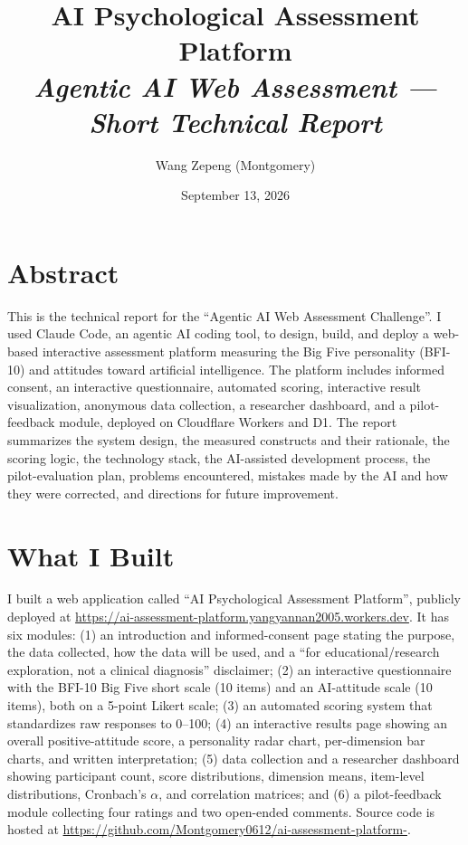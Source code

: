 \documentclass[11pt,a4paper]{article}
\title{\bfseries AI Psychological Assessment Platform\\[0.4em]
\large\mdseries\textit{Agentic AI Web Assessment --- Short Technical Report}}
\author{Wang Zepeng (Montgomery)}
\date{September 13, 2026}
\begin{document}
\maketitle

\section*{Abstract}

This is the technical report for the ``Agentic AI Web Assessment Challenge''. I used Claude Code, an agentic AI coding tool, to design, build, and deploy a web-based interactive assessment platform measuring the Big Five personality (BFI-10) and attitudes toward artificial intelligence. The platform includes informed consent, an interactive questionnaire, automated scoring, interactive result visualization, anonymous data collection, a researcher dashboard, and a pilot-feedback module, deployed on Cloudflare Workers and D1. The report summarizes the system design, the measured constructs and their rationale, the scoring logic, the technology stack, the AI-assisted development process, the pilot-evaluation plan, problems encountered, mistakes made by the AI and how they were corrected, and directions for future improvement.

\section{What I Built}

I built a web application called ``AI Psychological Assessment Platform'', publicly deployed at \url{https://ai-assessment-platform.yangyannan2005.workers.dev}. It has six modules: (1) an introduction and informed-consent page stating the purpose, the data collected, how the data will be used, and a ``for educational/research exploration, not a clinical diagnosis'' disclaimer; (2) an interactive questionnaire with the BFI-10 Big Five short scale (10 items) and an AI-attitude scale (10 items), both on a 5-point Likert scale; (3) an automated scoring system that standardizes raw responses to 0--100; (4) an interactive results page showing an overall positive-attitude score, a personality radar chart, per-dimension bar charts, and written interpretation; (5) data collection and a researcher dashboard showing participant count, score distributions, dimension means, item-level distributions, Cronbach's $\alpha$, and correlation matrices; and (6) a pilot-feedback module collecting four ratings and two open-ended comments. Source code is hosted at \url{https://github.com/Montgomery0612/ai-assessment-platform-}.
\end{document}
